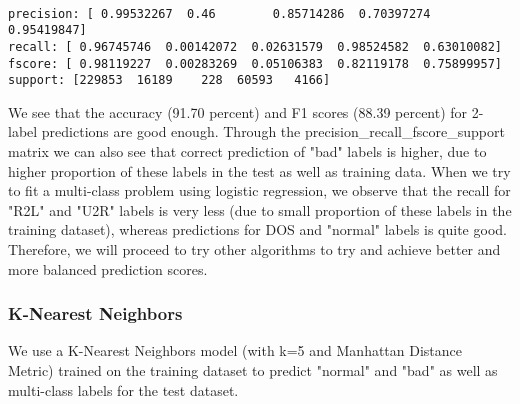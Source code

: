 \documentclass[11pt]{article}
\begin{document}
    \begin{center}
    \end{center}
    { \hspace*{\fill} \\}
    
    \begin{Verbatim}[commandchars=\\\{\}]
precision: [ 0.99532267  0.46        0.85714286  0.70397274  0.95419847]
recall: [ 0.96745746  0.00142072  0.02631579  0.98524582  0.63010082]
fscore: [ 0.98119227  0.00283269  0.05106383  0.82119178  0.75899957]
support: [229853  16189    228  60593   4166]

    \end{Verbatim}

    We see that the accuracy (91.70 percent) and F1 scores (88.39 percent)
for 2-label predictions are good enough. Through the
precision\_recall\_fscore\_support matrix we can also see that correct
prediction of "bad" labels is higher, due to higher proportion of these
labels in the test as well as training data. When we try to fit a
multi-class problem using logistic regression, we observe that the
recall for "R2L" and "U2R" labels is very less (due to small proportion
of these labels in the training dataset), whereas predictions for DOS
and "normal" labels is quite good. Therefore, we will proceed to try
other algorithms to try and achieve better and more balanced prediction
scores.

    \subsubsection{K-Nearest Neighbors}\label{k-nearest-neighbors}

We use a K-Nearest Neighbors model (with k=5 and Manhattan Distance
Metric) trained on the training dataset to predict "normal" and "bad" as
well as multi-class labels for the test dataset.
\end{document}
